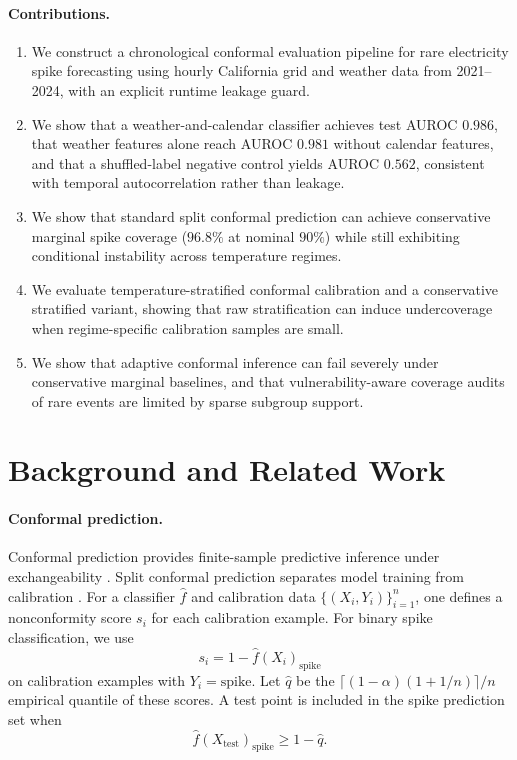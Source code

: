 \documentclass{article}
\newcommand{\test}{\mathrm{test}}
\newcommand{\spike}{\mathrm{spike}}
\begin{document}
\paragraph{Contributions.}
\begin{enumerate}
    \item We construct a chronological conformal evaluation pipeline for rare
    electricity spike forecasting using hourly California grid and weather data
    from 2021--2024, with an explicit runtime leakage guard.

    \item We show that a weather-and-calendar classifier achieves test AUROC
    $0.986$, that weather features alone reach AUROC $0.981$ without calendar
    features, and that a shuffled-label negative control yields AUROC $0.562$,
    consistent with temporal autocorrelation rather than leakage.

    \item We show that standard split conformal prediction can achieve
    conservative marginal spike coverage ($96.8\%$ at nominal $90\%$) while
    still exhibiting conditional instability across temperature regimes.

    \item We evaluate temperature-stratified conformal calibration and a
    conservative stratified variant, showing that raw stratification can induce
    undercoverage when regime-specific calibration samples are small.

    \item We show that adaptive conformal inference can fail severely under
    conservative marginal baselines, and that vulnerability-aware coverage
    audits of rare events are limited by sparse subgroup support.
\end{enumerate}

\section{Background and Related Work}
\label{sec:related}

\paragraph{Conformal prediction.}
Conformal prediction provides finite-sample predictive inference under
exchangeability \citep{vovk2005}. Split conformal prediction separates model
training from calibration \citep{angelopoulos2023}. For a classifier
$\hat{f}$ and calibration data $\{(X_i,Y_i)\}_{i=1}^{n}$, one defines a
nonconformity score $s_i$ for each calibration example. For binary spike
classification, we use
\begin{equation}
    s_i = 1 - \hat{f}(X_i)_{\spike}
\end{equation}
on calibration examples with $Y_i = \spike$. Let $\hat{q}$ be the
$\lceil(1-\alpha)(1+1/n)\rceil/n$ empirical quantile of these scores. A test
point is included in the spike prediction set when
\begin{equation}
    \hat{f}(X_{\test})_{\spike} \geq 1 - \hat{q}.
\end{equation}
\end{document}
